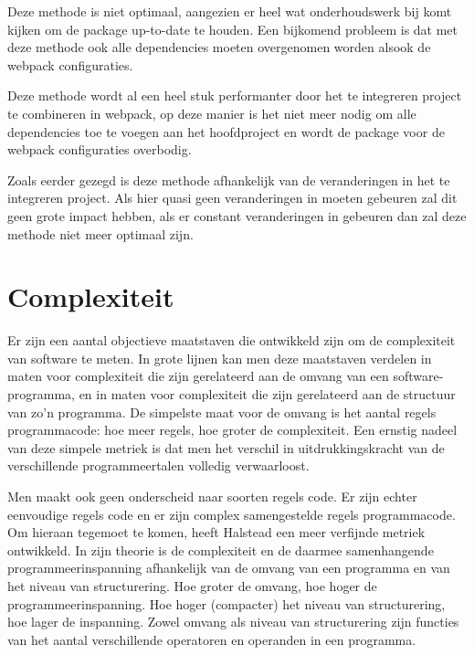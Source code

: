 Deze methode is niet optimaal, aangezien er heel wat onderhoudswerk bij komt kijken om de package up-to-date te houden. Een bijkomend probleem is dat met deze methode ook alle dependencies moeten overgenomen worden alsook de webpack configuraties. 

Deze methode wordt al een heel stuk performanter door het te integreren project te combineren in webpack, op deze manier is het niet meer nodig om alle dependencies toe te voegen aan het hoofdproject en wordt de package voor de webpack configuraties overbodig. 

Zoals eerder gezegd is deze methode afhankelijk van de veranderingen in het te integreren project. Als hier quasi geen veranderingen in moeten gebeuren zal dit geen grote impact hebben, als er constant veranderingen in gebeuren dan zal deze methode niet meer optimaal zijn. 

\section{Complexiteit}
Er zijn een aantal objectieve maatstaven die ontwikkeld zijn om de complexiteit van software te meten. In grote lijnen kan men deze maatstaven verdelen in maten voor complexiteit die zijn gerelateerd aan de omvang van een software-programma, en in maten voor complexiteit die zijn gerelateerd aan de structuur van zo'n programma. De simpelste maat voor de omvang is het aantal regels programmacode: hoe meer regels, hoe groter de complexiteit. Een ernstig nadeel van deze simpele metriek is dat men het verschil in uitdrukkingskracht van de verschillende programmeertalen volledig verwaarloost.

Men maakt ook geen onderscheid naar soorten regels code. Er zijn echter eenvoudige regels code en er zijn complex samengestelde regels programmacode. Om hieraan tegemoet te komen, heeft Halstead een meer verfijnde metriek ontwikkeld. In zijn theorie is de complexiteit en de daarmee samenhangende programmeerinspanning afhankelijk van de omvang van een programma en van het niveau van structurering. Hoe groter de omvang, hoe hoger de programmeerinspanning. Hoe hoger (compacter) het niveau van structurering, hoe lager de inspanning. Zowel omvang als niveau van structurering zijn functies van het aantal verschillende operatoren en operanden in een programma.
\autocite{complexiteit01}

